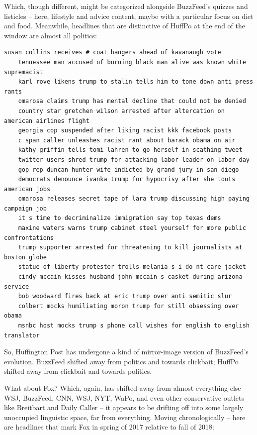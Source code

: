 \documentclass{scrartcl}
\begin{document}
Which, though different, might be categorized alongside BuzzFeed's quizzes and listicles -- here, lifestyle and advice content, maybe with a particular focus on diet and food. Meanwhile, headlines that are distinctive of HuffPo at the end of the window are almost all politics:

\begin{lstlisting}[basicstyle=\tiny\hlfont]
    susan collins receives # coat hangers ahead of kavanaugh vote
    tennessee man accused of burning black man alive was known white supremacist
    karl rove likens trump to stalin tells him to tone down anti press rants
    omarosa claims trump has mental decline that could not be denied
    country star gretchen wilson arrested after altercation on american airlines flight
    georgia cop suspended after liking racist kkk facebook posts
    c span caller unleashes racist rant about barack obama on air
    kathy griffin tells tomi lahren to go herself in scathing tweet
    twitter users shred trump for attacking labor leader on labor day
    gop rep duncan hunter wife indicted by grand jury in san diego
    democrats denounce ivanka trump for hypocrisy after she touts american jobs
    omarosa releases secret tape of lara trump discussing high paying campaign job
    it s time to decriminalize immigration say top texas dems
    maxine waters warns trump cabinet steel yourself for more public confrontations
    trump supporter arrested for threatening to kill journalists at boston globe
    statue of liberty protester trolls melania s i do nt care jacket
    cindy mccain kisses husband john mccain s casket during arizona service
    bob woodward fires back at eric trump over anti semitic slur
    colbert mocks humiliating moron trump for still obsessing over obama
    msnbc host mocks trump s phone call wishes for english to english translator
\end{lstlisting}

So, Huffington Post has undergone a kind of mirror-image version of BuzzFeed's evolution. BuzzFeed shifted away from politics and towards clickbait; HuffPo shifted away from clickbait and towards politics.

What about Fox? Which, again, has shifted away from almost everything else -- WSJ, BuzzFeed, CNN, WSJ, NYT, WaPo, and even other conservative outlets like Breitbart and Daily Caller -- it appears to be drifting off into some largely unoccupied linguistic space, far from everything. Moving chronologically -- here are headlines that mark Fox in spring of 2017 relative to fall of 2018:
\end{document}
